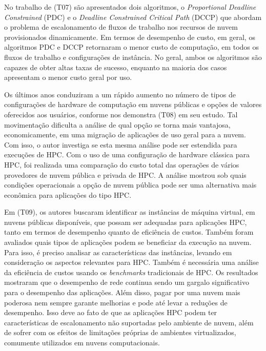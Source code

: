 \documentclass[tese,capa]{texufpel}
\begin{document}
No trabalho de \cite{arabnejadSchedulingDeadlineConstrained2017c} (T07) são apresentados dois algoritmos, o \textit{Proportional Deadline Constrained} (PDC) e o \textit{Deadline Constrained Critical Path} (DCCP) que abordam o problema de escalonamento de fluxos de trabalho nos recursos de nuvem provisionados dinamicamente. Em termos de desempenho de custo, em geral, os algoritmos PDC e DCCP retornaram o menor custo de computação, em todos os fluxos de trabalho e configurações de instância. No geral, ambos os algoritmos são capazes de obter altas taxas de sucesso, enquanto na maioria dos casos apresentam o menor custo geral por uso.

Os últimos anos conduziram a um rápido aumento no número de tipos de configurações de hardware de computação em nuvens públicas e opções de valores oferecidos aos usuários, conforme nos demonstra \cite{dreherCostAnalysisComparing2017e} (T08) em seu estudo. Tal movimentação dificulta a análise de qual opção se torna mais vantajosa, economicamente, em uma migração de aplicações de uso geral para a nuvem. Com isso, o autor investiga se esta mesma análise pode ser estendida para execuções de HPC. Com o uso de uma configuração de hardware clássica para HPC, foi realizada uma comparação do custo total das operações de vários provedores de nuvem pública e privada de HPC. A análise mostrou sob quais condições operacionais a opção de nuvem pública pode ser uma alternativa mais econômica para aplicações do tipo HPC.

Em \cite{roloffHPCApplicationPerformance2017c} (T09), os autores buscaram identificar as instâncias de máquina virtual, em nuvens públicas disponíveis, que possam ser adequadas para aplicações HPC, tanto em termos de desempenho quanto de eficiência de custos. Também foram avaliados quais tipos de aplicações podem se beneficiar da execução na nuvem. Para isso, é preciso analisar as características das instâncias, levando em consideração os aspectos relevantes para HPC. Também é necessária uma análise da eficiência de custos usando os \textit{benchmarks} tradicionais de HPC. Os resultados mostraram que o desempenho de rede continua sendo um gargalo significativo para o desempenho das aplicações. Além disso, pagar por uma nuvem mais poderosa nem sempre garante melhorias e pode até levar a reduções de desempenho. Isso deve ao fato de que as aplicações HPC podem ter características de escalonamento não suportadas pelo ambiente de nuvem, além de sofrer com os efeitos de limitações próprias de ambientes virtualizados, comumente utilizados em nuvens computacionais.
\end{document}
